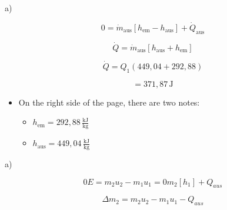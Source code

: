 a)

\[
0 = \dot{m}_{\text{aus}} \left[ h_{\text{em}} - h_{\text{aus}} \right] + \dot{Q}_{\text{aus}}
\]

\[
\dot{Q} = \dot{m}_{\text{aus}} \left[ h_{\text{aus}} + h_{\text{em}} \right]
\]

\[
\dot{Q} = Q_{\text{1}} \left( 449,04 + 292,88 \right)
\]

\[
= 371,87 \, \text{J}
\]

\begin{itemize}
    \item On the right side of the page, there are two notes:
    \begin{itemize}
        \item $h_{\text{em}} = 292,88 \, \frac{\text{kJ}}{\text{kg}}$
        \item $h_{\text{aus}} = 449,04 \, \frac{\text{kJ}}{\text{kg}}$
    \end{itemize}
\end{itemize}

a)

\[
0E = m_2 u_2 - m_1 u_1 = 0 m_2 \left[ h_1 \right] + Q_{aus}
\]

\[
\Delta m_2 = m_2 u_2 - m_1 u_1 - Q_{aus}
\]